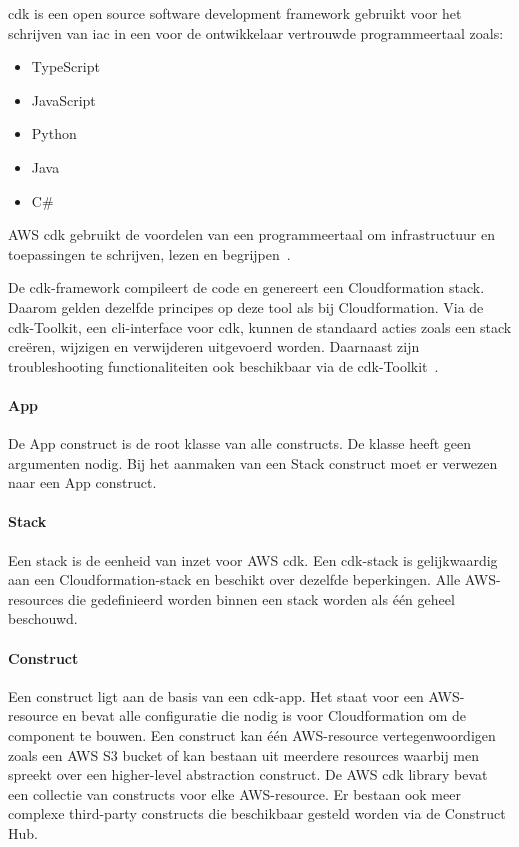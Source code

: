\acrfull{cdk} is een open source software development framework gebruikt voor het schrijven van \acrfull{iac} in een voor de ontwikkelaar vertrouwde programmeertaal zoals:

\begin{itemize}
    \item TypeScript
    \item JavaScript
    \item Python
    \item Java
    \item C\#
\end{itemize}

AWS \acrshort{cdk} gebruikt de voordelen van een programmeertaal om infrastructuur en toepassingen te schrijven, lezen en begrijpen~\autocite{Mansoor2014}.

De \acrshort{cdk}-framework compileert de code en genereert een Cloudformation stack.
Daarom gelden dezelfde principes op deze tool als bij Cloudformation.
Via de \acrshort{cdk}-Toolkit, een \acrshort{cli}-interface voor \acrshort{cdk}, kunnen de standaard acties zoals een stack creëren, wijzigen en verwijderen uitgevoerd worden.
Daarnaast zijn troubleshooting functionaliteiten ook beschikbaar via de \acrshort{cdk}-Toolkit~\autocite{Mansoor2014}.

\paragraph{App}

De App construct is de root klasse van alle constructs.
De klasse heeft geen argumenten nodig.
Bij het aanmaken van een Stack construct moet er verwezen naar een App construct.

\paragraph{Stack}

Een stack is de eenheid van inzet voor AWS \acrshort{cdk}.
Een \acrshort{cdk}-stack is gelijkwaardig aan een Cloudformation-stack en beschikt over dezelfde beperkingen.
Alle AWS-resources die gedefinieerd worden binnen een stack worden als één geheel beschouwd.

\paragraph{Construct}

Een construct ligt aan de basis van een \acrshort{cdk}-app.
Het staat voor een AWS-resource en bevat alle configuratie die nodig is voor Cloudformation om de component te bouwen.
Een construct kan één AWS-resource vertegenwoordigen zoals een AWS S3 bucket of kan bestaan uit meerdere resources waarbij men spreekt over een higher-level abstraction construct.
De AWS \acrshort{cdk} library bevat een collectie van constructs voor elke AWS-resource.
Er bestaan ook meer complexe third-party constructs die beschikbaar gesteld worden via de Construct Hub.

